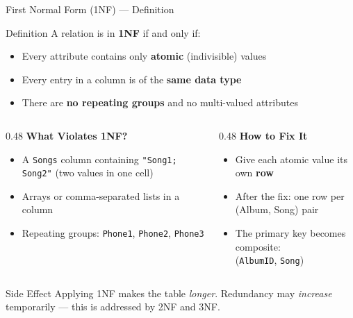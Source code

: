 \begin{frame}{First Normal Form (1NF) --- Definition}
  \begin{block}{Definition}
    A relation is in \textbf{1NF} if and only if:
    \begin{itemize}
      \item Every attribute contains only \textbf{atomic} (indivisible) values
      \item Every entry in a column is of the \textbf{same data type}
      \item There are \textbf{no repeating groups} and no multi-valued attributes
    \end{itemize}
  \end{block}

  \begin{columns}[t]
    \begin{column}{0.48\textwidth}
      \textbf{What Violates 1NF?}
      \begin{itemize}
        \item A \texttt{Songs} column containing
              \texttt{"Song1; Song2"} (two values in one cell)
        \item Arrays or comma-separated lists in a column
        \item Repeating groups: \texttt{Phone1}, \texttt{Phone2}, \texttt{Phone3}
      \end{itemize}
    \end{column}
    \begin{column}{0.48\textwidth}
      \textbf{How to Fix It}
      \begin{itemize}
        \item Give each atomic value its own \textbf{row}
        \item After the fix: one row per (Album, Song) pair
        \item The primary key becomes composite:\\
              (\texttt{AlbumID}, \texttt{Song})
      \end{itemize}
    \end{column}
  \end{columns}

  \vspace{0.4em}
  \begin{alertblock}{Side Effect}
    Applying 1NF makes the table \emph{longer}. Redundancy may \emph{increase}
    temporarily --- this is addressed by 2NF and 3NF.
  \end{alertblock}
\end{frame}

